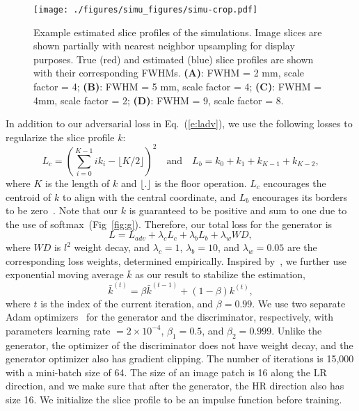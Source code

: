 \documentclass[runningheads]{llncs}
\begin{document}
\begin{figure}[t]
    \centering
    \texttt{[image: ./figures/simu\_figures/simu-crop.pdf]}
    \caption{Example estimated slice profiles of the simulations.
    Image slices are shown partially with nearest neighbor upsampling
    for display purposes. True (red) and estimated (blue) slice
    profiles are shown with their corresponding FWHMs. \textbf{(A)}:
    FWHM = 2 mm, scale factor = 4; \textbf{(B)}: FWHM = 5 mm, scale
    factor = 4; \textbf{(C)}: FWHM = 4mm, scale factor = 2;
    \textbf{(D)}: FWHM = 9, scale factor = 8.}
    \label{fig:simu}
\end{figure}

In addition to our adversarial loss in Eq.~(\ref{e:ladv}), we use the
following losses to regularize the slice profile $k$:
%
\begin{equation*}
  L_c = \left(\sum_{i=0}^{K-1}{ik_i} - \lfloor K  / 2 \rfloor
  \right)^2
  \quad \mathrm{and} \quad
  L_b = k_0 + k_1 + k_{K - 1} + k_{K - 2},
\end{equation*}
%
where $K$ is the length of $k$ and $\lfloor . \rfloor$ is the floor
operation. $L_c$ encourages the centroid of $k$ to align with the
central coordinate, and $L_b$ encourages its borders to be
zero~\cite{bell-2019-kernelgan}. Note that our $k$ is guaranteed to be
positive and sum to one due to the use of
softmax~(Fig~\ref{fig:g}). Therefore, our total loss for the generator
is
%
\begin{equation*}
  L = L_{adv} + \lambda_c L_c + \lambda_b L_b + \lambda_w WD,
\end{equation*}
%
where $WD$ is $l^2$ weight decay, and $\lambda_c = 1$, $\lambda_b =
10$, and $\lambda_w = 0.05$ are the corresponding loss weights,
determined empirically. Inspired by~\cite{yazici-2018-average}, we
further use exponential moving average $\bar{k}$ as our result to
stabilize the estimation,
%
\begin{equation*}
  \bar{k}^{(t)} = \beta \bar{k}^{(t-1)} + (1 - \beta) k^{(t)},
\end{equation*}
%
where $t$ is the index of the current iteration, and $\beta = 0.99$. We
use two separate Adam optimizers~\cite{kingma-2017-adam} for the
generator and the discriminator, respectively, with parameters learning rate $= 2
\times 10^{-4}$, $\beta_1=0.5$, and $\beta_2 = 0.999$. Unlike the
generator, the optimizer of the discriminator does not have weight
decay, and the generator optimizer also has gradient clipping. The
number of iterations is 15,000 with a mini-batch size of 64. The size of
an image patch is 16 along the LR direction, and we make sure that
after the generator, the HR direction also has size 16. We initialize
the slice profile to be an impulse function before training.
\end{document}
